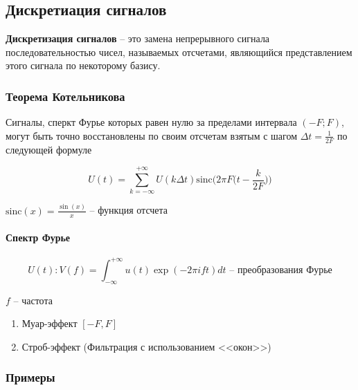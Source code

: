 \subsection{Дискретиация сигналов}

\textbf{Дискретизация сигналов} -- это замена непрерывного сигнала последовательностью чисел, называемых отсчетами, являющийся представлением этого сигнала по некоторому базису.

\subsubsection{Теорема Котельникова}

Сигналы, сперкт Фурье которых равен нулю за пределами интервала $(-F; F)$, могут быть точно восстановлены по своим отсчетам взятым с шагом $\Delta t = \frac{1}{2F}$ по следующей формуле

\begin{equation*}
    U(t) = \sum_{k=-\infty}^{+\infty} U(k \Delta t) \text{sinc} \bigg( 2 \pi F \big(t - \frac{k}{2F}\big) \bigg)
\end{equation*}

$\text{sinc} (x) = \frac{\sin(x)}{x}$ -- функция отсчета

\paragraph{Спектр Фурье}

\begin{equation*}
    U(t) : V(f) = \int_{-\infty}^{+\infty} u(t) \exp (-2\pi ift) dt \text{ -- преобразования Фурье}
\end{equation*}

$f$ -- частота

\begin{enumerate}
    \item Муар-эффект $[-F, F]$
    \item Строб-эффект (Фильтрация с использованием <<окон>>)
\end{enumerate}

\subsubsection{Примеры}


